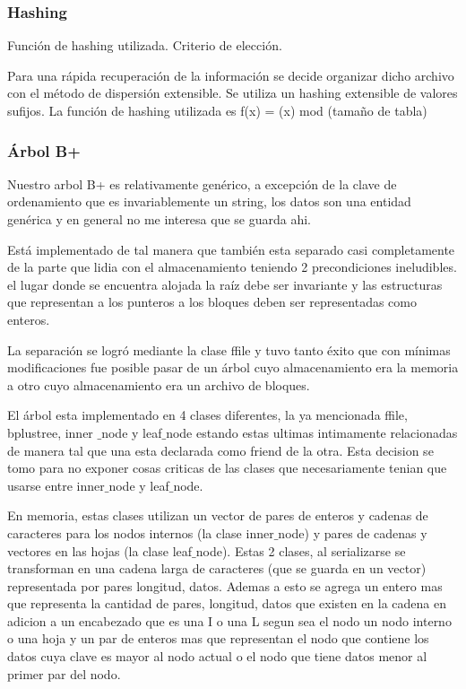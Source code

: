 \documentclass[a4paper,10pt]{article}
\begin{document}
\subsubsection{Hashing}
Función de hashing utilizada. Criterio de elección. 

Para una rápida recuperación de la información se decide organizar dicho archivo con el método de dispersión extensible. Se utiliza un hashing extensible de valores sufijos. La función de hashing utilizada es f(x) = (x) mod (tamaño de tabla) 


\subsubsection{Árbol B+}
Nuestro arbol B+ es relativamente genérico, a excepción de la clave de ordenamiento que es invariablemente un string, los datos son una entidad genérica y en general no me interesa que se guarda ahi.

Está implementado de tal manera que también esta separado casi completamente de la parte que lidia con el almacenamiento teniendo 2 precondiciones ineludibles. el lugar donde se encuentra alojada la raíz debe ser invariante y las estructuras que representan a los punteros a los bloques deben ser representadas como enteros.

La separación se logró mediante la clase ffile y tuvo tanto éxito que con mínimas modificaciones fue posible pasar de un árbol cuyo almacenamiento era la memoria a otro cuyo almacenamiento era un archivo de bloques.

El árbol esta implementado en 4 clases diferentes, la ya mencionada ffile, bplustree, inner  $\_$node y leaf$\_$node estando estas ultimas intimamente relacionadas de manera tal que una esta declarada como friend de la otra. Esta decision se tomo para no exponer cosas criticas de las clases que necesariamente tenian que usarse entre inner$\_$node y leaf$\_$node.

En memoria, estas clases utilizan un vector de pares de enteros y cadenas de caracteres para los nodos internos (la clase inner$\_$node) y pares de cadenas y vectores en las hojas (la clase leaf$\_$node). Estas 2 clases, al serializarse se transforman en una cadena larga de caracteres (que se guarda en un vector) representada por pares longitud, datos. Ademas a esto se agrega un entero mas que representa la cantidad de pares, longitud, datos que existen en la cadena en adicion a un encabezado que es una I o una L segun sea el nodo un nodo interno o una hoja y un par de enteros mas que representan el nodo que contiene los datos cuya clave es mayor al nodo actual o el nodo que tiene datos menor al primer par del nodo.
\end{document}

